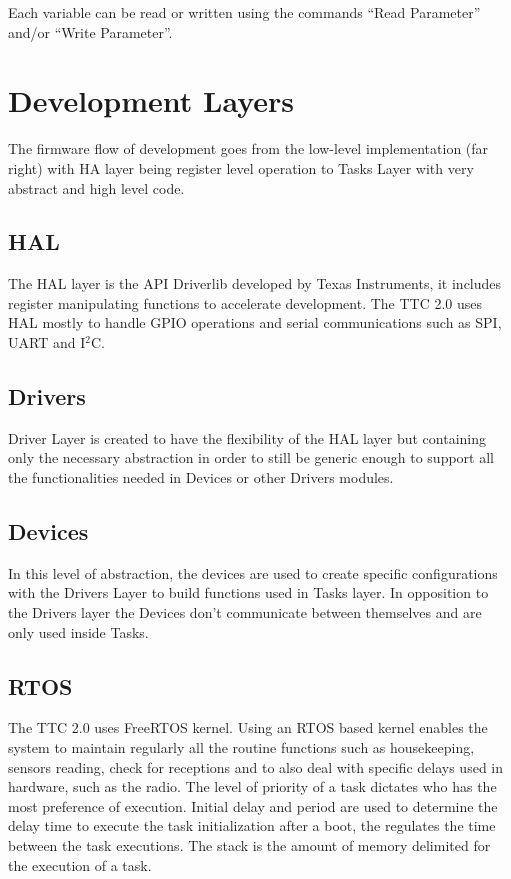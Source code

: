 Each variable can be read or written using the commands ``Read Parameter'' and/or ``Write Parameter''.

\section{Development Layers}

The firmware flow of development goes from the low-level implementation (far right) with HA layer being register level operation to Tasks Layer with very abstract and high level code.

\subsection{HAL}

The HAL layer is the API Driverlib developed by Texas Instruments, it includes register manipulating functions to accelerate development. The TTC 2.0 uses HAL mostly to handle GPIO operations and serial communications such as SPI, UART and I$^2$C.

\subsection{Drivers}

Driver Layer is created to have the flexibility of the HAL layer but containing only the necessary abstraction in order to still be generic enough to support all the functionalities needed in Devices or other Drivers modules.

\subsection{Devices}

In this level of abstraction, the devices are used to create specific configurations with the Drivers Layer to build functions used in Tasks layer. In opposition to the Drivers layer the Devices don't communicate between themselves and are only used inside Tasks.

\subsection{RTOS}

The TTC 2.0 uses FreeRTOS kernel. Using an RTOS based kernel enables the system to maintain regularly all the routine functions such as housekeeping, sensors reading, check for receptions and to also deal with specific delays used in hardware, such as the radio. The level of priority of a task dictates who has the most preference of execution. Initial delay and period are used to determine the delay time to execute the task initialization after a boot, the regulates the time between the task executions. The stack is the amount of memory delimited for the execution of a task.

